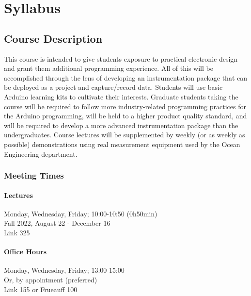 %

\chapter{Syllabus} 

\section*{Course Description} 
This course is intended to give students exposure to practical electronic design and grant them additional programming experience. 
All of this will be accomplished through the lens of developing an instrumentation package that can be deployed as a project and capture/record data. 
Students will use basic Arduino learning kits to cultivate their interests. 
Graduate students taking the course will be required to follow more industry-related programming practices for the Arduino programming, will be held to a higher product quality standard, and will be required to develop a more advanced instrumentation package than the undergraduates. 
Course lectures will be supplemented by weekly (or as weekly as possible) demonstrations using real measurement equipment used by the Ocean Engineering department.

    \subsection*{Meeting Times}
        \subsubsection*{Lectures}
        Monday, Wednesday, Friday; 10:00-10:50 (0h50min)\\
        Fall 2022, August 22 - December 16\\
        Link 325

        \subsubsection*{Office Hours}
        Monday, Wednesday, Friday; 13:00-15:00\\
        Or, by appointment (preferred)\\
        Link 155 or Frueauff 100

